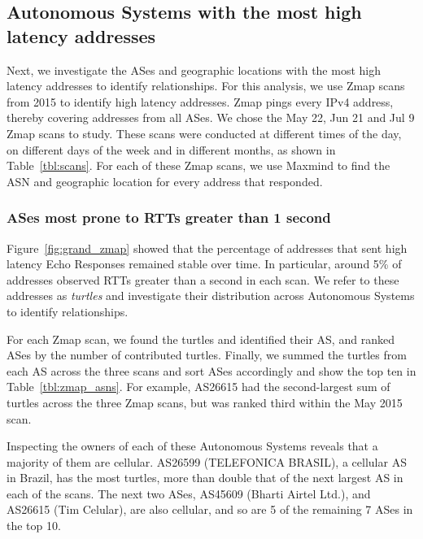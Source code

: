 \subsection{Autonomous Systems with the most high latency addresses}
\label{subsec:motivation}

Next, we investigate the ASes and geographic locations with the most high latency
addresses to identify relationships. For this analysis, we use Zmap scans from 2015 to
identify high latency addresses. Zmap pings every IPv4 address,
thereby covering addresses from all ASes. We chose
the May 22, Jun 21 and Jul 9 Zmap scans to study. These scans
were conducted at different times of the day, on different days of the week
and in different months, as shown in Table~\ref{tbl:scans}.
For each of these Zmap scans, we use Maxmind to find the ASN and geographic
location for every address that responded.
\subsubsection*{ASes most prone to RTTs greater than 1 second}

Figure~\ref{fig:grand_zmap} showed that the percentage of
addresses that sent high latency Echo Responses remained stable over time.
%
In particular, around 5\% of addresses observed RTTs greater than
a second in each scan. We refer to these addresses as \emph{turtles} and
investigate their distribution 
across Autonomous Systems to identify relationships.

For each Zmap scan, we found the turtles and identified
their AS, and ranked ASes by the number of contributed
turtles. Finally, we summed the turtles from each AS across the three
scans and sort ASes accordingly and show the top ten in Table~\ref{tbl:zmap_asns}. For
example, AS26615 had the second-largest sum of turtles across the three Zmap
scans, but was ranked third within the May 2015 scan.

Inspecting the owners of each of these Autonomous Systems reveals that a majority of them are cellular. 
%
AS26599 (TELEFONICA BRASIL), a cellular AS in Brazil, has the most
turtles, more than double that of the next largest AS in
each of the scans. 
%
The next two ASes, AS45609 (Bharti Airtel Ltd.), and AS26615 (Tim Celular), are also cellular, 
and so are 5 of
the remaining 7 ASes in the top 10. 

